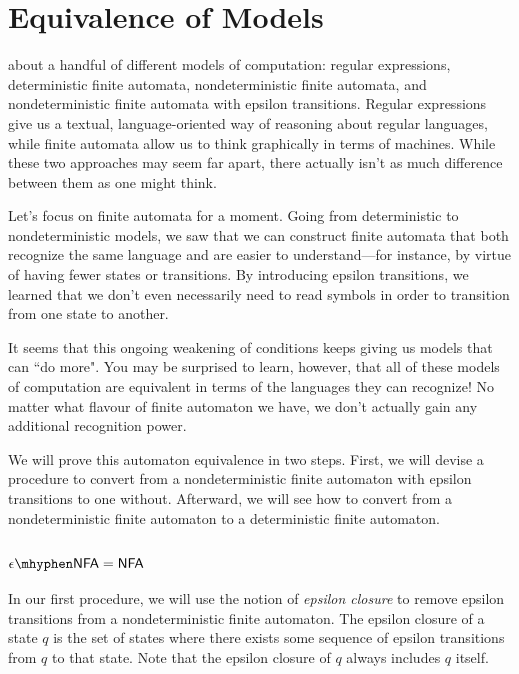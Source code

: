 \section{Equivalence of Models}\label{sec:equivalenceofmodelsregular}

 about a handful of different models of computation: regular expressions, deterministic finite automata, nondeterministic finite automata, and nondeterministic finite automata with epsilon transitions. Regular expressions give us a textual, language-oriented way of reasoning about regular languages, while finite automata allow us to think graphically in terms of machines. While these two approaches may seem far apart, there actually isn't as much difference between them as one might think.

Let's focus on finite automata for a moment. Going from deterministic to nondeterministic models, we saw that we can construct finite automata that both recognize the same language and are easier to understand---for instance, by virtue of having fewer states or transitions. By introducing epsilon transitions, we learned that we don't even necessarily need to read symbols in order to transition from one state to another.

It seems that this ongoing weakening of conditions keeps giving us models that can ``do more". You may be surprised to learn, however, that all of these models of computation are equivalent in terms of the languages they can recognize! No matter what flavour of finite automaton we have, we don't actually gain any additional recognition power.

We will prove this automaton equivalence in two steps. First, we will devise a procedure to convert from a nondeterministic finite automaton with epsilon transitions to one without. Afterward, we will see how to convert from a nondeterministic finite automaton to a deterministic finite automaton.

\subsection{$\ENFA = \NFA$}

In our first procedure, we will use the notion of \emph{epsilon closure} to remove epsilon transitions from a nondeterministic finite automaton. The epsilon closure of a state $q$ is the set of states where there exists some sequence of epsilon transitions from $q$ to that state. Note that the epsilon closure of $q$ always includes $q$ itself.

